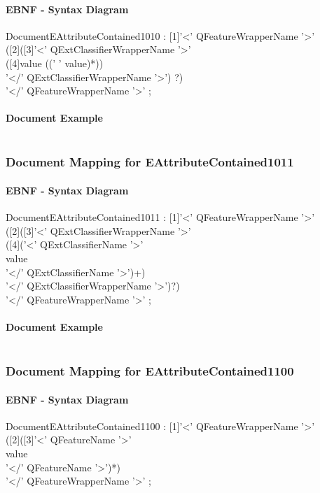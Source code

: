 \documentclass[11pt,a4paper]{article}
\begin{document}
\paragraph{EBNF - Syntax Diagram}
\begin{rail}
DocumentEAttributeContained1010 : [1]'<' QFeatureWrapperName '>' \\
([2]([3]'<' QExtClassifierWrapperName '>' \\
([4]value ((' ' value)*)) \\
'</' QExtClassifierWrapperName '>') ?) \\
'</' QFeatureWrapperName '>' ;
\end{rail}

\paragraph{Document Example}
\inputminted[fontsize=\footnotesize]{xml}{examples/EAttributeContained1010.xml}

\subsubsection{Document Mapping for EAttributeContained1011}
\paragraph{EBNF - Syntax Diagram}
\begin{rail}
DocumentEAttributeContained1011 : [1]'<' QFeatureWrapperName '>' \\
([2]([3]'<' QExtClassifierWrapperName '>' \\
([4]('<' QExtClassifierName '>' \\
value \\
'</' QExtClassifierName '>')+) \\
'</' QExtClassifierWrapperName '>')?)\\
'</' QFeatureWrapperName '>' ;
\end{rail}
\paragraph{Document Example}
\inputminted[fontsize=\footnotesize]{xml}{examples/EAttributeContained1011.xml}

\subsubsection{Document Mapping for EAttributeContained1100}
\paragraph{EBNF - Syntax Diagram}
\begin{rail}
DocumentEAttributeContained1100 : [1]'<' QFeatureWrapperName '>' \\
([2]([3]'<' QFeatureName '>'  \\
value \\
'</' QFeatureName '>')*) \\
'</' QFeatureWrapperName '>' ;
\end{rail}
\end{document}
